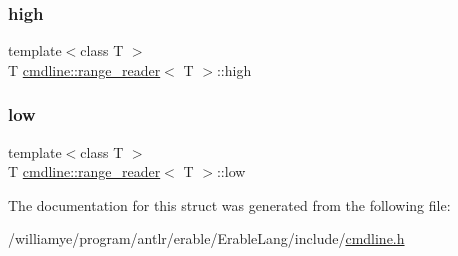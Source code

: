 \subsubsection{\texorpdfstring{high}{high}}
{\footnotesize\ttfamily template$<$class T $>$ \\
T \mbox{\hyperlink{structcmdline_1_1range__reader}{cmdline\+::range\+\_\+reader}}$<$ T $>$\+::high\hspace{0.3cm}{\ttfamily [private]}}

\mbox{\label{structcmdline_1_1range__reader_a60c345e84d2a96dcd2de47a66eca8104}} 
\subsubsection{\texorpdfstring{low}{low}}
{\footnotesize\ttfamily template$<$class T $>$ \\
T \mbox{\hyperlink{structcmdline_1_1range__reader}{cmdline\+::range\+\_\+reader}}$<$ T $>$\+::low\hspace{0.3cm}{\ttfamily [private]}}



The documentation for this struct was generated from the following file\+:\begin{DoxyCompactItemize}
\item 
/williamye/program/antlr/erable/\+Erable\+Lang/include/\mbox{\hyperlink{cmdline_8h}{cmdline.\+h}}\end{DoxyCompactItemize}
